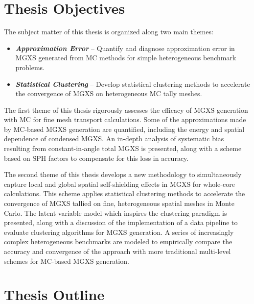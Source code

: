 \section{Thesis Objectives}
\label{sec:chap1-objectives}

The subject matter of this thesis is organized along two main themes:

\begin{itemize}
\item \textbf{\textit{Approximation Error}} -- Quantify and diagnose approximation error in \ac{MGXS} generated from \ac{MC} methods for simple heterogeneous benchmark problems.
\item \textbf{\textit{Statistical Clustering}} -- Develop statistical clustering methods to accelerate the convergence of \ac{MGXS} on heterogeneous \ac{MC} tally meshes.
\end{itemize}

The first theme of this thesis rigorously assesses the efficacy of \ac{MGXS} generation with \ac{MC} for fine mesh transport calculations. Some of the approximations made by \ac{MC}-based \ac{MGXS} generation are quantified, including the energy and spatial dependence of condensed \ac{MGXS}. An in-depth analysis of systematic bias resulting from constant-in-angle total \ac{MGXS} is presented, along with a scheme based on \ac{SPH} factors to compensate for this loss in accuracy. 

The second theme of this thesis develops a new methodology to simultaneously capture local and global spatial self-shielding effects in \ac{MGXS} for whole-core calculations. This scheme applies statistical clustering methods to accelerate the convergence of \ac{MGXS} tallied on fine, heterogeneous spatial meshes in Monte Carlo. The latent variable model which inspires the clustering paradigm is presented, along with a discussion of the implementation of a data pipeline to evaluate clustering algorithms for \ac{MGXS} generation. A series of increasingly complex heterogeneous benchmarks are modeled to empirically compare the accuracy and convergence of the approach with more traditional multi-level schemes for \ac{MC}-based MGXS generation.


\section{Thesis Outline}
\label{sec:chap1-outline}

